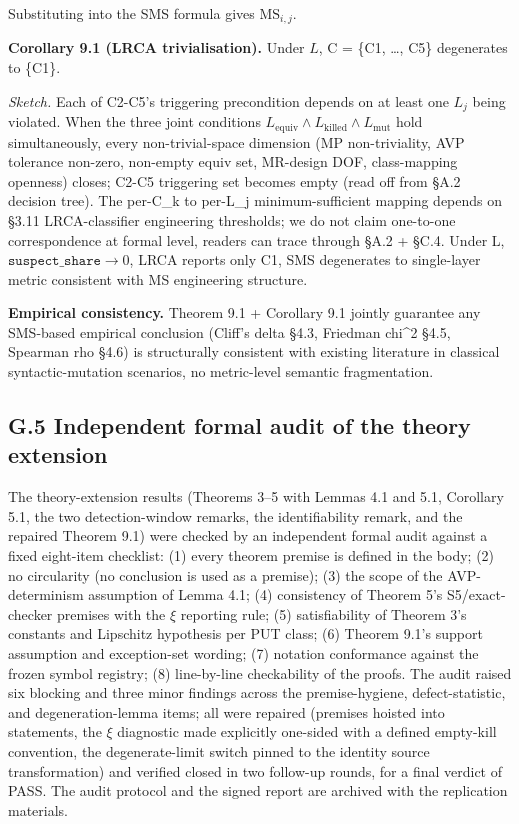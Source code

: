 \documentclass[manuscript,screen,review]{acmart}
\begin{document}
Substituting into the SMS formula gives $\mathrm{MS}_{i,j}$.

\textbf{Corollary 9.1 (LRCA trivialisation).} Under $L$, C
= \{C1, \ldots, C5\} degenerates to \{C1\}.

\emph{Sketch.} Each of C2-C5's triggering precondition depends on at
least one $L_j$ being violated. When the three joint conditions
$L_{\mathrm{equiv}} \wedge L_{\mathrm{killed}} \wedge L_{\mathrm{mut}}$ hold simultaneously,
every non-trivial-space dimension (MP non-triviality, AVP tolerance
non-zero, non-empty equiv set, MR-design DOF, class-mapping openness)
closes; C2-C5 triggering set becomes empty (read off from §A.2 decision
tree). The per-C\_k to per-L\_j minimum-sufficient mapping depends on
§3.11 LRCA-classifier engineering thresholds; we do not claim one-to-one
correspondence at formal level, readers can trace through §A.2 + §C.4.
Under L, $\texttt{suspect\_share} \to 0$, LRCA reports only C1, SMS degenerates to
single-layer metric consistent with \citet{d7c38286734419b52de4262c9802ebdfcf4b9447} MS engineering
structure.

\textbf{Empirical consistency.} Theorem 9.1 + Corollary 9.1 jointly
guarantee any SMS-based empirical conclusion (Cliff's delta §4.3,
Friedman chi\^{}2 §4.5, Spearman rho §4.6) is structurally consistent
with existing \citet{d7c38286734419b52de4262c9802ebdfcf4b9447} literature in classical
syntactic-mutation scenarios, no metric-level semantic fragmentation.

\subsection{G.5 Independent formal audit of the theory extension}\label{g.5-independent-formal-audit}

The theory-extension results (Theorems 3--5 with Lemmas 4.1 and 5.1,
Corollary 5.1, the two detection-window remarks, the identifiability
remark, and the repaired Theorem 9.1) were checked by an independent
formal audit against a fixed eight-item checklist: (1) every theorem
premise is defined in the body; (2) no circularity (no conclusion is
used as a premise); (3) the scope of the AVP-determinism assumption of
Lemma 4.1; (4) consistency of Theorem 5's S5/exact-checker premises with
the $\xi$ reporting rule; (5) satisfiability of Theorem 3's constants
and Lipschitz hypothesis per PUT class; (6) Theorem 9.1's support
assumption and exception-set wording; (7) notation conformance against
the frozen symbol registry; (8) line-by-line checkability of the proofs.
The audit raised six blocking and three minor findings across the
premise-hygiene, defect-statistic, and degeneration-lemma items; all
were repaired (premises hoisted into statements, the $\xi$ diagnostic
made explicitly one-sided with a defined empty-kill convention, the
degenerate-limit switch pinned to the identity source transformation)
and verified closed in two follow-up rounds, for a final verdict of
PASS. The audit protocol and the signed report are archived with the
replication materials.
\end{document}
